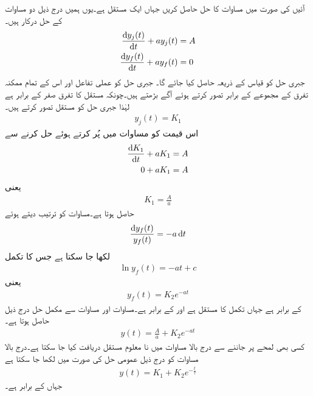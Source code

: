 آئیں  کی صورت میں مساوات  کا حل حاصل کریں جہاں  ایک مستقل ہے۔یوں ہمیں درج ذیل دو مساوات کے حل درکار ہیں۔
\begin{align}
\frac{\dif y_j(t)}{\dif t}+a y_j(t)&=A \label{مساوات_عارضی_یک_درجی_عمومی_مساوات_پ}\\
\frac{\dif y_f(t)}{\dif t}+a y_f(t)&=0\label{مساوات_عارضی_یک_درجی_عمومی_مساوات_ت}
\end{align}
جبری حل کو قیاس کے ذریعہ حاصل کیا جائے گا۔  جبری حل کو عملی تفاعل اور اس کے تمام ممکنہ تفرق کے مجموعے کے برابر تصور کرتے ہوئے آگے بڑھتے ہیں۔چونکہ مستقل کا تفرق  صفر کے برابر ہے لہٰذا جبری حل کو مستقل  تصور کرتے ہیں۔
\begin{align}
y_j(t)=K_1
\end{align}
اس قیمت کو مساوات  میں پُر کرتے ہوئے حل کرنے سے
\begin{align*}
\frac{\dif K_1}{\dif t}+a K_1&=A \\
0+a K_1&=A
\end{align*}
یعنی
\begin{align}\label{مساوات_عارضی_یک_درجی_عمومی_مساوات_ٹ}
K_1=\frac{A}{a}
\end{align}
حاصل ہوتا ہے۔مساوات  کو ترتیب دیتے ہوئے
\begin{align*}
\frac{\dif y_f(t)}{y_f(t)}=-a \dif t
\end{align*}
لکھا جا سکتا ہے  جس کا تکمل
\begin{align*}
\ln y_f(t)=-a t +c
\end{align*}
یعنی
\begin{align}\label{مساوات_عارضی_یک_درجی_عمومی_مساوات_ث}
y_f(t)=K_2e^{-at}
\end{align}
کے برابر ہے جہاں  تکمل کا مستقل ہے اور  کے برابر ہے۔مساوات  اور مساوات  سے مکمل حل درج ذیل حاصل ہوتا ہے۔
\begin{align}
y(t)=\frac{A}{a}+K_2 e^{-at}
\end{align}
کسی بھی لمحے پر  جاننے سے درج بالا مساوات میں نا معلوم مستقل  دریافت کیا جا سکتا ہے۔درج بالا مساوات کو درج ذیل عمومی حل کی صورت میں لکھا جا سکتا ہے
\begin{align}\label{مساوات_عارضی_یک_درجی_عمومی_مساوات_ج}
y(t)=K_1+K_2 e^{-\frac{t}{\tau}}
\end{align}
جہاں  کے برابر ہے۔


